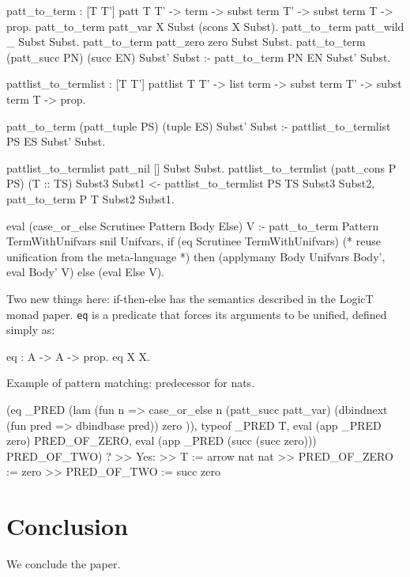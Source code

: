 \documentclass[format=acmlarge,review,anonymous]{acmart}\settopmatter{printfolios=true}
\begin{document}
\begin{codequote}
patt_to_term : [T T'] patt T T' -> term -> subst term T' -> subst term T -> prop.
patt_to_term patt_var X Subst (scons X Subst).
patt_to_term patt_wild _ Subst Subst.
patt_to_term patt_zero zero Subst Subst.
patt_to_term (patt_succ PN) (succ EN) Subst' Subst :- patt_to_term PN EN Subst' Subst.

pattlist_to_termlist : [T T'] pattlist T T' -> list term -> subst term T' -> subst term T -> prop.

patt_to_term (patt_tuple PS) (tuple ES) Subst' Subst :-
  pattlist_to_termlist PS ES Subst' Subst.

pattlist_to_termlist patt_nil [] Subst Subst.
pattlist_to_termlist (patt_cons P PS) (T :: TS) Subst3 Subst1 <-
  pattlist_to_termlist PS TS Subst3 Subst2,
  patt_to_term P T Subst2 Subst1.

eval (case_or_else Scrutinee Pattern Body Else) V :-
  patt_to_term Pattern TermWithUnifvars snil Unifvars,
  if (eq Scrutinee TermWithUnifvars)  (* reuse unification from the meta-language *)
  then (applymany Body Unifvars Body', eval Body' V)
  else (eval Else V).
\end{codequote}

Two new things here: if-then-else has the semantics described in the LogicT monad paper. \texttt{eq}
is a predicate that forces its arguments to be unified, defined simply as:

\begin{codequote}
eq : A -> A -> prop.
eq X X.
\end{codequote}

Example of pattern matching: predecessor for nats.

\begin{codequote}
(eq _PRED 
  (lam (fun n => 
    case_or_else n
      (patt_succ patt_var) (dbindnext (fun pred => dbindbase pred))
      zero
      )),
 typeof _PRED T,
 eval (app _PRED zero) PRED_OF_ZERO,
 eval (app _PRED (succ (succ zero))) PRED_OF_TWO) ?
>> Yes:
>> T := arrow nat nat
>> PRED_OF_ZERO := zero
>> PRED_OF_TWO := succ zero
\end{codequote}



\section{Conclusion}

\TODO{} We conclude the paper.


\end{document}
